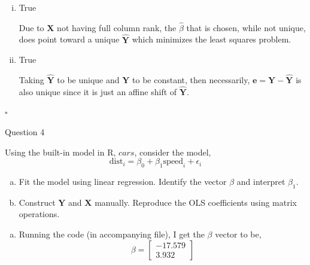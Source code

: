 \documentclass[12pt,letterpaper, onecolumn]{exam}
\begin{document}
\begin{questions}
\begin{solution}
\begin{enumerate}[a.)]
\begin{enumerate}[i.)]
            The values of $\beta$ do not need to be unique.
            
            \item True

            Due to $\textbf{X}$ not having full column rank, the $\hat{\beta}$ that is chosen, while not unique, does point toward a unique $\hat{\textbf{Y}}$ which minimizes the least squares problem.

            \item True

            Taking $\hat{\textbf{Y}}$ to be unique and $\textbf{Y}$ to be constant, then necessarily, $\textbf{e}=\textbf{Y}-\hat{\textbf{Y}}$ is also unique since it is just an affine shift of $\hat{\textbf{Y}}$.
        \end{enumerate}
    \end{enumerate}

        
        $\square$
        
    \end{solution}

    \newpage

    \question[8] Question 4\droppoints

    Using the built-in model in R, $\textit{cars}$, consider the model,
    \begin{equation*}
        \text{dist}_i=\beta_0 + \beta_1\text{speed}_i + \epsilon_i
    \end{equation*}

    \begin{enumerate}[a.)]
        \item Fit the model using linear regression. Identify the vector $\beta$ and interpret $\beta_1$.
        \item Construct $\textbf{Y}$ and $\textbf{X}$ manually. Reproduce the OLS coefficients using matrix operations.
    \end{enumerate}

    \begin{solution}

        \begin{enumerate}[a.)]
            \item 
        
            Running the code (in accompanying file), I get the $\beta$ vector to be,
            \begin{equation*}
                \beta = \left[\begin{array}{c}
                    -17.579 \\ 3.932 
                \end{array} \right]
            \end{equation*}
    

\end{enumerate}
\end{solution}
\end{questions}
\end{document}

